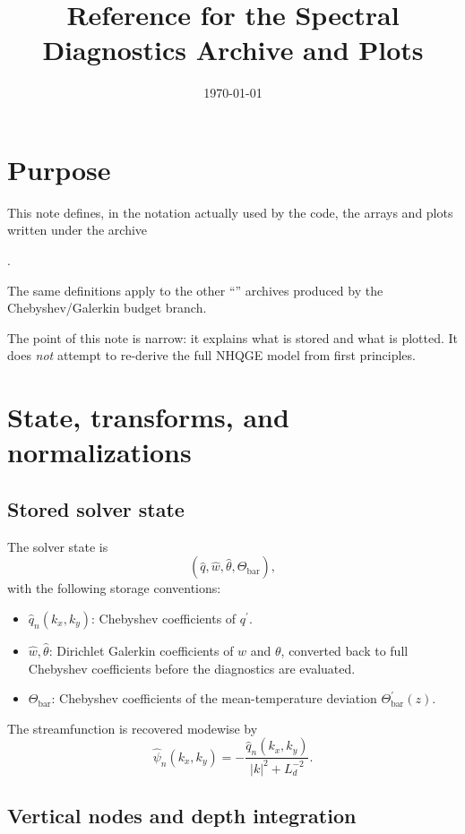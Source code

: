 \documentclass[11pt]{article}
\title{Reference for the Spectral Diagnostics Archive and Plots}
\author{}
\date{\today}
\newcommand{\psihat}{\widehat{\psi}}
\newcommand{\qhat}{\widehat{q}}
\newcommand{\what}{\widehat{w}}
\newcommand{\thhat}{\widehat{\theta}}
\begin{document}
\maketitle

\section{Purpose}

This note defines, in the notation actually used by the code, the arrays and
plots written under the archive
\begin{center}
.
\end{center}
The same definitions apply to the other ``''
archives produced by the Chebyshev/Galerkin budget branch.

The point of this note is narrow: it explains what is stored and what is
plotted. It does \emph{not} attempt to re-derive the full NHQGE model from
first principles.

\section{State, transforms, and normalizations}

\subsection{Stored solver state}

The solver state is
\[
(\qhat,\what,\thhat,\Theta_{\mathrm{bar}}),
\]
with the following storage conventions:
\begin{itemize}
\item \(\qhat_n(k_x,k_y)\): Chebyshev coefficients of \(q^{\prime}\).
\item \(\what,\thhat\): Dirichlet Galerkin coefficients of \(w\) and
  \(\theta\), converted back to full Chebyshev coefficients before the
  diagnostics are evaluated.
\item \(\Theta_{\mathrm{bar}}\): Chebyshev coefficients of the mean-temperature
  deviation \(\Theta_{\mathrm{bar}}^{\prime}(z)\).
\end{itemize}

The streamfunction is recovered modewise by
\[
\psihat_n(k_x,k_y)
=
-\frac{\qhat_n(k_x,k_y)}{|k|^2 + L_d^{-2}}.
\]

\subsection{Vertical nodes and depth integration}
\end{document}
